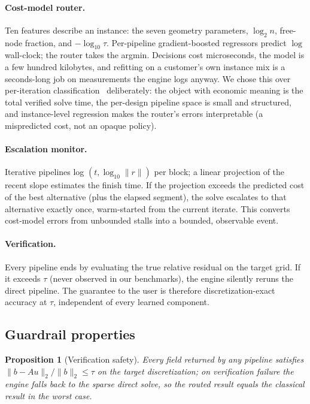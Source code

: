 \documentclass[11pt]{article}
\newtheorem{proposition}{Proposition}
\begin{document}
\paragraph{Cost-model router.} Ten features describe an instance: the seven
geometry parameters, $\log_2 n$, free-node fraction, and $-\log_{10}\tau$.
Per-pipeline gradient-boosted regressors predict $\log$ wall-clock; the router
takes the argmin. Decisions cost microseconds, the model is a few hundred
kilobytes, and refitting on a customer's own instance mix is a
seconds-long job on measurements the engine logs anyway. We chose this over
per-iteration classification~\cite{router} deliberately: the object with
economic meaning is the total verified solve time, the per-design pipeline
space is small and structured, and instance-level regression makes the
router's errors interpretable (a mispredicted cost, not an opaque policy).

\paragraph{Escalation monitor.} Iterative pipelines log
$(t, \log_{10}\|r\|)$ per block; a linear projection of the recent slope
estimates the finish time. If the projection exceeds the predicted cost of the
best alternative (plus the elapsed segment), the solve escalates to that
alternative exactly once, warm-started from the current iterate. This converts
cost-model errors from unbounded stalls into a bounded, observable event.

\paragraph{Verification.} Every pipeline ends by evaluating the true relative
residual on the target grid. If it exceeds $\tau$ (never observed in our
benchmarks), the engine silently reruns the direct pipeline. The guarantee to
the user is therefore discretization-exact accuracy at $\tau$, independent of
every learned component.

\subsection{Guardrail properties}
\begin{proposition}[Verification safety]
Every field returned by any pipeline satisfies
$\|b - Au\|_2 / \|b\|_2 \le \tau$ on the target discretization; on
verification failure the engine falls back to the sparse direct solve, so the
routed result equals the classical result in the worst case.
\end{proposition}
\end{document}
